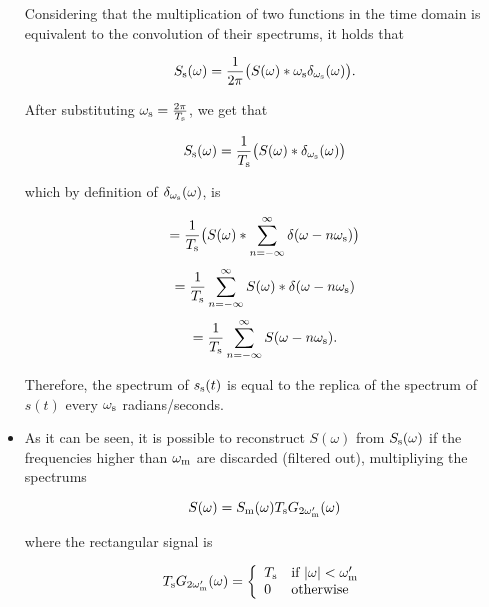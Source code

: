 \begin{itemize}
  Considering that the multiplication of two functions in the time domain is equivalent to the convolution of their spectrums, it holds that

  \begin{equation}
    S_{\text s}(\omega) = \frac{1}{2\pi}\big(S(\omega)*\omega_{\text s}\delta_{\omega_{\text s}}(\omega)\big).
  \end{equation}

  After substituting $\omega_{\text s}=\frac{2\pi}{T_{\text s}}$, we get that

  \begin{equation}
    S_{\text s}(\omega) = \frac{1}{T_{\text s}}\big(S(\omega)*\delta_{\omega_{\text s}}(\omega)\big)
  \end{equation}

  which by definition of $\delta_{\omega_{\text s}}(\omega)$, is

  \begin{equation}
    = \frac{1}{T_{\text s}}\big(S(\omega)*\sum_{n=-\infty}^{\infty}\delta(\omega-n\omega_{\text s})\big)
  \end{equation}
  \begin{equation}
    = \frac{1}{T_{\text s}}\sum_{n=-\infty}^{\infty}S(\omega)*\delta(\omega-n\omega_{\text s})
  \end{equation}
  \begin{equation}
    = \frac{1}{T_{\text s}}\sum_{n=-\infty}^{\infty}S(\omega-n\omega_{\text s}).
  \end{equation}

  Therefore, the spectrum of $s_{\text s}(t)$ is equal to the replica  of the spectrum of $s(t)$ every $\omega_{\text s}$ radians/seconds.


\item As it can be seen, it is possible to reconstruct $S(\omega)$ from $S_{\text s}(\omega)$ if the frequencies higher than $\omega_{\text m}$ are discarded (filtered out), multipliying the spectrums

  \begin{equation}
    S(\omega) = S_{\text m}(\omega)T_{\text s}G_{2\omega_{\text m}'}(\omega)
  \end{equation}

  where the rectangular signal is

  \begin{equation}
    T_{\text s}G_{2\omega_{\text m}'}(\omega) =
    \left\{
    \begin{array}{ll}
      T_{\text s} & \text{if $|\omega| < \omega_{\text m}'$} \\
      0 & \text{otherwise}
    \end{array}
    \right.
  \end{equation}


\end{itemize}
